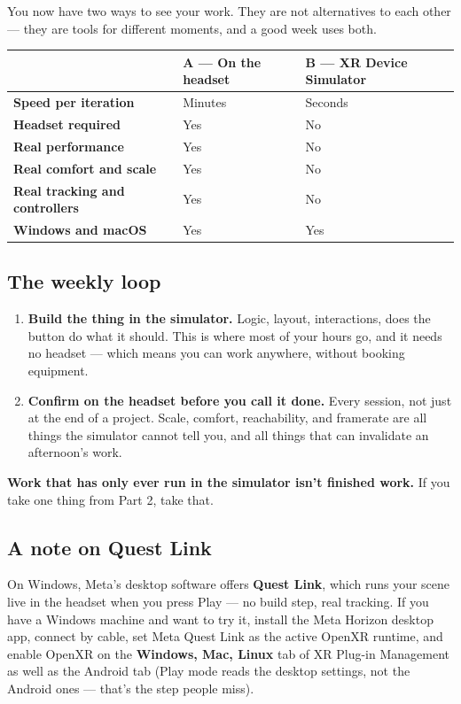 \documentclass[11pt,a4paper]{article}
\providecommand{\tightlist}{\setlength{\itemsep}{2pt}\setlength{\parskip}{0pt}}
\begin{document}
You now have two ways to see your work. They are not alternatives to each other --- they
are tools for different moments, and a good week uses both.

\begin{longtable}[]{@{}lll@{}}
\toprule\noalign{}
& \textbf{A --- On the headset} & \textbf{B --- XR Device Simulator} \\
\midrule\noalign{}
\endhead
\bottomrule\noalign{}
\endlastfoot
\textbf{Speed per iteration} & Minutes & Seconds \\
\textbf{Headset required} & Yes & No \\
\textbf{Real performance} & Yes & No \\
\textbf{Real comfort and scale} & Yes & No \\
\textbf{Real tracking and controllers} & Yes & No \\
\textbf{Windows and macOS} & Yes & Yes \\
\end{longtable}

\subsection{The weekly loop}\label{the-weekly-loop}

\begin{enumerate}
\def\labelenumi{\arabic{enumi}.}
\tightlist
\item
  \textbf{Build the thing in the simulator.} Logic, layout, interactions, does the button do
  what it should. This is where most of your hours go, and it needs no headset --- which
  means you can work anywhere, without booking equipment.
\item
  \textbf{Confirm on the headset before you call it done.} Every session, not just at the end
  of a project. Scale, comfort, reachability, and framerate are all things the simulator
  cannot tell you, and all things that can invalidate an afternoon's work.
\end{enumerate}

\textbf{Work that has only ever run in the simulator isn't finished work.} If you take one
thing from Part 2, take that.

\subsection{A note on Quest Link}\label{a-note-on-quest-link}

On Windows, Meta's desktop software offers \textbf{Quest Link}, which runs your scene live in
the headset when you press Play --- no build step, real tracking. If you have a Windows
machine and want to try it, install the Meta Horizon desktop app, connect by cable, set
Meta Quest Link as the active OpenXR runtime, and enable OpenXR on the \textbf{Windows, Mac,
Linux} tab of XR Plug-in Management as well as the Android tab (Play mode reads the
desktop settings, not the Android ones --- that's the step people miss).
\end{document}
